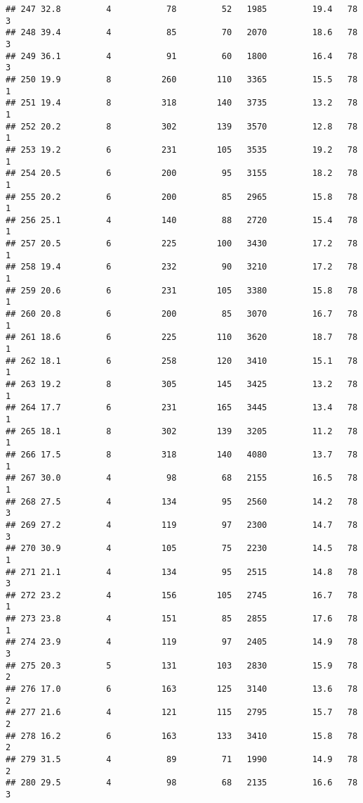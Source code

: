 \documentclass[
]{article}
\begin{document}
\begin{verbatim}
## 247 32.8         4           78         52   1985         19.4   78      3
## 248 39.4         4           85         70   2070         18.6   78      3
## 249 36.1         4           91         60   1800         16.4   78      3
## 250 19.9         8          260        110   3365         15.5   78      1
## 251 19.4         8          318        140   3735         13.2   78      1
## 252 20.2         8          302        139   3570         12.8   78      1
## 253 19.2         6          231        105   3535         19.2   78      1
## 254 20.5         6          200         95   3155         18.2   78      1
## 255 20.2         6          200         85   2965         15.8   78      1
## 256 25.1         4          140         88   2720         15.4   78      1
## 257 20.5         6          225        100   3430         17.2   78      1
## 258 19.4         6          232         90   3210         17.2   78      1
## 259 20.6         6          231        105   3380         15.8   78      1
## 260 20.8         6          200         85   3070         16.7   78      1
## 261 18.6         6          225        110   3620         18.7   78      1
## 262 18.1         6          258        120   3410         15.1   78      1
## 263 19.2         8          305        145   3425         13.2   78      1
## 264 17.7         6          231        165   3445         13.4   78      1
## 265 18.1         8          302        139   3205         11.2   78      1
## 266 17.5         8          318        140   4080         13.7   78      1
## 267 30.0         4           98         68   2155         16.5   78      1
## 268 27.5         4          134         95   2560         14.2   78      3
## 269 27.2         4          119         97   2300         14.7   78      3
## 270 30.9         4          105         75   2230         14.5   78      1
## 271 21.1         4          134         95   2515         14.8   78      3
## 272 23.2         4          156        105   2745         16.7   78      1
## 273 23.8         4          151         85   2855         17.6   78      1
## 274 23.9         4          119         97   2405         14.9   78      3
## 275 20.3         5          131        103   2830         15.9   78      2
## 276 17.0         6          163        125   3140         13.6   78      2
## 277 21.6         4          121        115   2795         15.7   78      2
## 278 16.2         6          163        133   3410         15.8   78      2
## 279 31.5         4           89         71   1990         14.9   78      2
## 280 29.5         4           98         68   2135         16.6   78      3

\end{verbatim}
\end{document}
